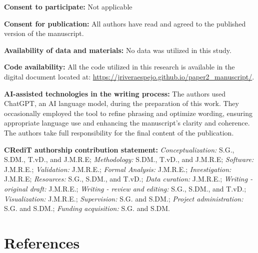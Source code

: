 \documentclass[
  authoryear,
  preprint,
  1p]{elsarticle}
\begin{document}
\textbf{Consent to participate:} Not applicable

\textbf{Consent for publication:} All authors have read and agreed to
the published version of the manuscript.

\textbf{Availability of data and materials:} No data was utilized in
this study.

\textbf{Code availability:} All the code utilized in this research is
available in the digital document located at:
\url{https://jriveraespejo.github.io/paper2_manuscript/}.

\textbf{AI-assisted technologies in the writing process:} The authors
used ChatGPT, an AI language model, during the preparation of this work.
They occasionally employed the tool to refine phrasing and optimize
wording, ensuring appropriate language use and enhancing the
manuscript's clarity and coherence. The authors take full responsibility
for the final content of the publication.

\textbf{CRediT authorship contribution statement:}
\emph{Conceptualization:} S.G., S.DM., T.vD., and J.M.R.E;
\emph{Methodology:} S.DM., T.vD., and J.M.R.E; \emph{Software:}
J.M.R.E.; \emph{Validation:} J.M.R.E.; \emph{Formal Analysis:} J.M.R.E.;
\emph{Investigation:} J.M.R.E; \emph{Resources:} S.G., S.DM., and T.vD.;
\emph{Data curation:} J.M.R.E.; \emph{Writing - original draft:}
J.M.R.E.; \emph{Writing - review and editing:} S.G., S.DM., and T.vD.;
\emph{Visualization:} J.M.R.E.; \emph{Supervision:} S.G. and S.DM.;
\emph{Project administration:} S.G. and S.DM.; \emph{Funding
acquisition:} S.G. and S.DM.

\newpage{}

\section*{References}\label{references}

\renewcommand{\bibsection}{}

\end{document}
